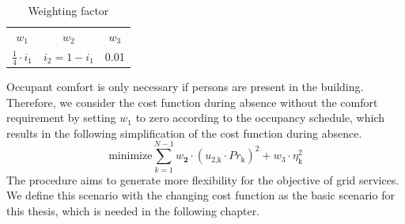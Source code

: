 \begin{table}[h]
    \centering
    \begin{tabular}{c|c|c}
         $w_\text{1}$ & $w_\text{2}$ & $w_\text{3}$ \\
        $\frac{1}{4} \cdot i_\text{1}$ & $i_\text{2}=1-i_\text{1}$ & 0.01
    \end{tabular}
    \caption{Weighting factor}
    \label{tab:weighting factor}
\end{table}
Occupant comfort is only necessary if persons are present in the building. Therefore, we consider the cost function during absence without the comfort requirement by setting $w_\text{1}$ to zero according to the occupancy schedule, which results in the following simplification of the cost function during absence.
    \begin{equation}
        \text{minimize} \sum_{k=1}^{N-1} w_\textbf{2}\cdot(u_\text{2,k}\cdot Pr_\text{k})^2 + w_\text{3} \cdot \eta_\text{k}^2
        \label{eq:costfunctionAbwesenheit}
    \end{equation}
The procedure aims to generate more flexibility for the objective of grid services. We define this scenario with the changing cost function as the basic scenario for this thesis, which is needed in the following chapter.  %

